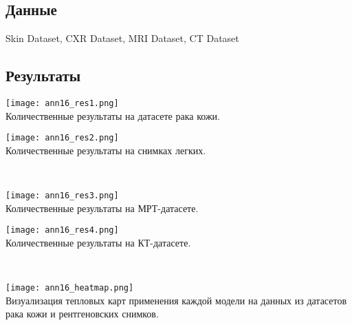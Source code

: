 \subsection*{Данные}
Skin Dataset, CXR Dataset, MRI Dataset, CT Dataset
\subsection*{Результаты}

\begin{minipage}{0.49\linewidth}
    \begin{center}
        \texttt{[image: ann16\_res1.png]} \\
        \caption{\scriptsize{
            Количественные результаты на датасете рака кожи.
        }}
    \end{center}
    
\end{minipage}
\begin{minipage}{0.49\linewidth}
    \begin{center}
        \texttt{[image: ann16\_res2.png]} \\
        \caption{\scriptsize{ 
            Количественные результаты на снимках легких.}}
    \end{center}
    
\end{minipage} 

\\

\begin{minipage}{0.49\linewidth}
    \begin{center}
        \texttt{[image: ann16\_res3.png]} \\
        \caption{\scriptsize{
            Количественные результаты на МРТ-датасете.
        }}
    \end{center}
    
\end{minipage}
\begin{minipage}{0.49\linewidth}
    \begin{center}
        \texttt{[image: ann16\_res4.png]} \\
        \caption{\scriptsize{ 
            Количественные результаты на КТ-датасете.}}
    \end{center}
    
\end{minipage} 

\\
\begin{minipage}{1.0\linewidth}
    \begin{center}
        \texttt{[image: ann16\_heatmap.png]} \\
        \caption{\scriptsize{
            Визуализация тепловых карт применения каждой модели на данных из датасетов 
            рака кожи и рентгеновских снимков.
        }}
    \end{center}
    
\end{minipage} 
